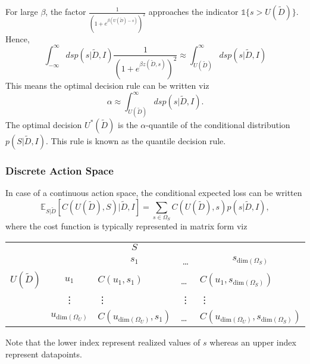 \begin{example}
	For large $\beta$, the factor $\frac{1}{(1+e^{\beta (U(\tilde{D})-s)})^2}$ approaches the indicator $\mathbb{1}\{s>U(\tilde{D})\}$. Hence,
	\begin{equation}
		\int_{-\infty}^{\infty} ds p(s|\tilde{D},I)\frac{1}{(1+e^{\beta z(\tilde{D},s)})^2} \approx \int_{U(\tilde{D})}^{\infty} ds p(s|\tilde{D},I)
	\end{equation}
	This means the optimal decision rule can be written viz
	\begin{equation}
		\alpha \approx \int_{U(\tilde{D})}^{\infty} ds p(s|\tilde{D},I).
		\label{eq:quantile_decision_rule}
	\end{equation}
	The optimal decision $U^*(\tilde{D})$ is the $\alpha$-quantile of the conditional distribution $p(S|\tilde{D},I)$. This rule is known as the quantile decision rule.
\end{example}

\subsubsection{Discrete Action Space}
In case of a continuous action space, the conditional expected loss can be written
\begin{equation}
	\mathbb{E}_{S|\tilde{D}}[C(U(\tilde{D}), S)|\tilde{D},I] = \sum_{s\in \Omega_S}C(U(\tilde{D}),s)p(s|\tilde{D},I),
	\label{eq:conditional_cost_discrete}
\end{equation}
where the cost function is typically represented in matrix form viz
\begin{center}
	\begin{tabular}{ c  c  c  c  c  }
		&& $S$& & \\
		&& $s_1$ & \dots & $s_{\text{dim}(\Omega_S)}$ \\
		\cline{3-5}
		$U(\tilde{D})$ & $u_1$& \multicolumn{1}{|l}{$C(u_1, s_1)$} &\multicolumn{1}{l}{\dots}&\multicolumn{1}{l|}{$C(u_1, s_{\text{dim}(\Omega_S)})$} \\
		& \vdots & \multicolumn{1}{|l}{\vdots} &\multicolumn{1}{l}{\vdots}&\multicolumn{1}{l|}{\vdots} \\
		& $u_{\text{dim}(\Omega_U)}$ & \multicolumn{1}{|l}{$C(u_{\text{dim}(\Omega_U)}, s_1)$} &\multicolumn{1}{l}{\dots}&\multicolumn{1}{l|}{$C(u_{\text{dim}(\Omega_U)}, s_{\text{dim}(\Omega_S)})$} \\
		\cline{3-5}
	\end{tabular}
\end{center}
Note that the lower index represent realized values of $s$ whereas an upper index represent datapoints.


